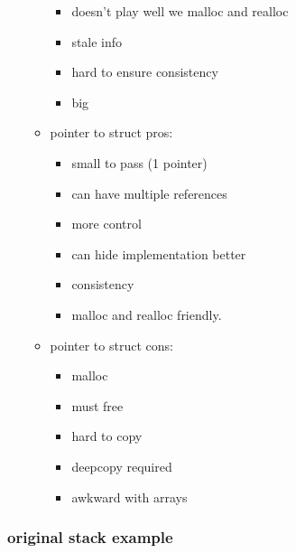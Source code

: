 \documentclass[11pt]{article}
\begin{document}
\begin{itemize}
\begin{itemize}
\begin{itemize}
\item doesn't play well we malloc and realloc
\item stale info
\item hard to ensure consistency
\item big
\end{itemize}
\item pointer to struct pros:
\begin{itemize}
\item small to pass (1 pointer)
\item can have multiple references
\item more control
\item can hide implementation better
\item consistency
\item malloc and realloc friendly.
\end{itemize}
\item pointer to struct cons:
\begin{itemize}
\item malloc
\item must free
\item hard to copy
\item deepcopy required
\item awkward with arrays
\end{itemize}
\end{itemize}
\end{itemize}

\subsubsection{original stack example}
\label{sec:orgfceaffd}
\end{document}
